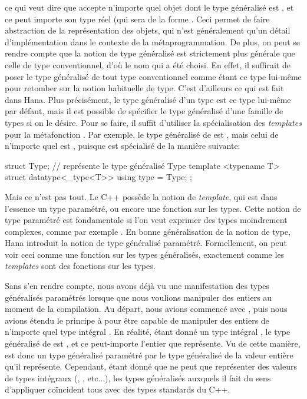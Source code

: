 ce qui veut dire que  accepte n'importe quel objet dont le
type généralisé est , et ce peut importe son type réel (qui sera
de la forme . Ceci permet de faire abstraction de la
représentation des objets, qui n'est généralement qu'un détail
d'implémentation dans le contexte de la métaprogrammation. De plus, on peut se
rendre compte que la notion de type généralisé est strictement plus générale
que celle de type conventionnel, d'où le nom qui a été choisi. En effet, il
suffirait de poser le type généralisé de tout type conventionnel comme étant
ce type lui-même pour retomber sur la notion habituelle de type. C'est
d'ailleurs ce qui est fait dans Hana. Plus précisément, le type généralisé
d'un type est ce type lui-même par défaut, mais il est possible de spécifier
le type généralisé d'une famille de types si on le désire. Pour se faire, il
suffit d'utiliser la spécialisation des \textit{templates} pour la métafonction
. Par exemple, le type généralisé de  est ,
mais celui de n'importe quel  est , puisque
 est spécialisé de la manière suivante:
\begin{cpp}
    struct Type; // représente le type généralisé Type
    template <typename T>
    struct datatype<_type<T>> {
        using type = Type;
    };
\end{cpp}

Mais ce n'est pas tout. Le C++ possède la notion de \textit{template}, qui est
dans l'essence un type paramétré, ou encore une fonction sur les types. Cette
notion de type paramétré est fondamentale si l'on veut exprimer des
types moindrement complexes, comme par exemple . En
bonne généralisation de la notion de type, Hana introduit la notion de
type généralisé paramétré. Formellement, on peut voir ceci comme une
fonction sur les types généralisés, exactement comme les \textit{templates}
sont des fonctions sur les types.

Sans s'en rendre compte, nous avons déjà vu une manifestation des types
généralisés paramétrés lorsque que nous voulions manipuler des entiers
au moment de la compilation. Au départ, nous avions commencé avec
, puis nous avions étendu le principe à
 pour être capable de manipuler des entiers
de n'importe quel type intégral . En réalité, étant donné un type
intégral , le type généralisé de 
est , et ce peut-importe l'entier  que
 représente. Vu de cette manière,
 est donc un type généralisé paramétré par
le type généralisé  de la valeur entière qu'il représente.
Cependant, étant donné que  ne peut que représenter
des valeurs de types intégraux (, , etc...), les types
généralisés auxquels il fait du sens d'appliquer 
coïncident tous avec des types standards du C++.

